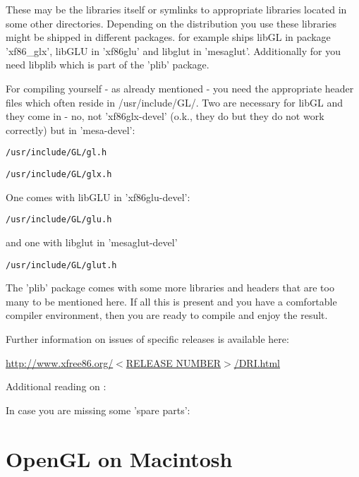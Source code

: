 These may be the libraries itself or symlinks to appropriate libraries
located in some other directories. Depending on the distribution you use
these libraries might be shipped in different packages.  for example
ships libGL in package 'xf86\_glx', libGLU in 'xf86glu' and libglut in
'mesaglut'. Additionally for \FlightGear{} you need libplib which is part of
the 'plib' package.

For compiling \FlightGear{} yourself - as already mentioned - you need the
appropriate header files which often reside in /usr/include/GL/. Two are
necessary for libGL and they come in - no, not 'xf86glx-devel' (o.k., they
do but they do not work correctly) but in 'mesa-devel':
\medskip

\texttt{/usr/include/GL/gl.h}

\texttt{/usr/include/GL/glx.h}
\medskip

\noindent
One comes with libGLU in 'xf86glu-devel':
\medskip

\texttt{/usr/include/GL/glu.h}
\medskip

and one with libglut in 'mesaglut-devel'
\medskip

\texttt{/usr/include/GL/glut.h}
\medskip

The 'plib' package comes with some more libraries and headers that are too
many to be mentioned here. If all this is present and you have a comfortable
compiler environment, then you are ready to compile \FlightGear{} and enjoy the
result.


Further information on  issues of specific  releases is
available here:
\medskip

\underline{http://www.xfree86.org/{$<$}RELEASE NUMBER{$>$}/DRI.html}

\medskip

\noindent
Additional reading on :
\medskip

\medskip

\noindent
In case you are missing some 'spare parts':
\medskip



\section{OpenGL on Macintosh}

